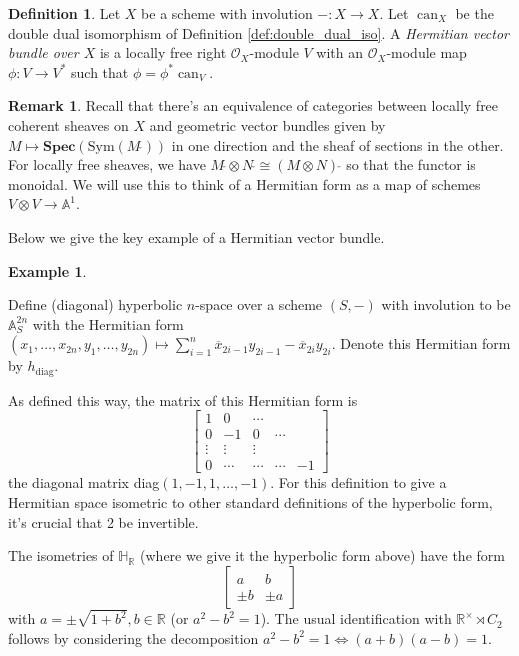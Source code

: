 \documentclass[edeposit,fullpage]{uiucthesis2009}
\newcommand{\mbb}{\mathbb}
\newcommand{\mc}{\mathcal}
\newcommand{\dual}{\,\check{}}
\DeclareMathOperator{\can}{can}
\theoremstyle{plain}
\numberwithin{lemma}{section}
\theoremstyle{definition}
\newtheorem{example}[lemma]{Example}
\newtheorem{definition}[lemma]{Definition}
\newtheorem{remark}[lemma]{Remark}
\begin{document}
\begin{definition}\label{def:herm_form_sch}
Let $X$ be a scheme with involution $- : X \rightarrow X$. Let
$\can_X$ be the double dual isomorphism of Definition \ref{def:double_dual_iso}. A
\emph{Hermitian vector bundle over $X$} is a locally free right $\mc
O_X$-module $V$ with an $\mc O_X$-module map $\phi : V \rightarrow
V^*$ such that $\phi = \phi^*\can_V$.
\end{definition}

\begin{remark}
  Recall that there's an equivalence of categories between locally
  free coherent sheaves on $X$ and geometric vector bundles given by
  $M \mapsto \mathbf{Spec}(\mathrm{Sym}(M\dual))$ in one direction and the sheaf
  of sections in the other. For locally free sheaves, we have $M\dual
  \otimes N\dual \cong (M \otimes N)\dual$ so that the functor is
  monoidal. We will use this to think of a Hermitian
  form as a map of schemes $V \otimes V \rightarrow \mbb A^1$.
\end{remark}

Below we give the key example of a Hermitian vector bundle.

\begin{example}\label{ex:hyp_space}

Define (diagonal) hyperbolic $n$-space over a scheme $(S,-)$ with involution to be $\mbb A^{2n}_S$
with the Hermitian form $(x_1,\dots,x_{2n},y_1,\dots,y_{2n}) \mapsto
\sum_{i=1}^n  \overline x_{2i-1} y_{2i-1} -  \overline x_{2i}
y_{2i}$. Denote this Hermitian form by $h_{\mathrm{diag}}$.

As defined this way, the matrix of this Hermitian form is
\[
\begin{bmatrix}
1 & 0 & \cdots \\
0 & -1 & 0 & \cdots \\
\vdots & \vdots & \vdots \\
0 & \cdots & \cdots & \cdots & -1
\end{bmatrix}
\]
the diagonal matrix diag$(1,-1,1,\dots,-1)$. For this definition to
give a Hermitian space isometric to other standard definitions of the
hyperbolic form, it's crucial that 2 be invertible. 

The isometries of $\mbb H_{\mbb R}$ (where we give it the hyperbolic
form above) have the form
\[
\begin{bmatrix}
a & b\\
\pm b & \pm a
\end{bmatrix}
\]
with $a = \pm\sqrt{1 + b^2}, b \in \mbb R$ (or $a^2 - b^2 = 1$). The
usual identification with $\mbb R^\times \rtimes C_2$ follows by
considering the decomposition $a^2 - b^2 = 1 \iff (a+b)(a-b) = 1$.
\end{example}
\end{document}
